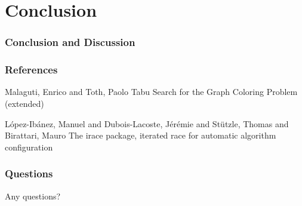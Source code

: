 \documentclass{beamer}
\begin{document}

  \section{Conclusion}
  \begin{frame}
    \frametitle{Conclusion and Discussion}


  \end{frame}





\begin{frame}
  \frametitle<presentation>{References}    
  \begin{thebibliography}{2}
    
  \beamertemplatearticlebibitems
    Malaguti, Enrico and Toth, Paolo
    \newblock Tabu Search for the Graph Coloring Problem (extended)


    L{\'o}pez-Ib{\'a}nez, Manuel and Dubois-Lacoste, J{\'e}r{\'e}mie and St{\"u}tzle, Thomas and Birattari, Mauro
    \newblock The irace package, iterated race for automatic algorithm configuration


  \end{thebibliography}
\end{frame}

\begin{frame}
\frametitle{Questions}
\centerline{Any questions?}
\end{frame}
\end{document}

